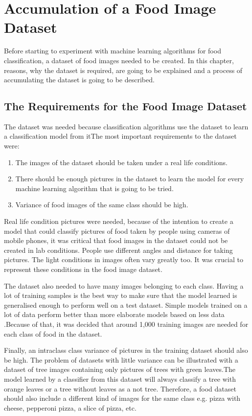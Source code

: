 \chapter{Accumulation of a Food Image Dataset}

Before starting to experiment with machine learning algorithms for food classification, a dataset of food images needed to be created. In this chapter, reasons, why the dataset is required, are going to be explained and a process of accumulating the dataset is going to be described.

\section{The Requirements for the Food Image Dataset}
 The dataset was needed because classification algorithms use the dataset to learn a classification model from itThe most important requirements to the dataset were:

\begin{enumerate}
  \item The images of the dataset should be taken under a real life conditions.
  \item There should be enough pictures in the dataset to learn the model for every machine learning algorithm that is going to be tried.
  \item Variance of food images of the same class should be high. 
\end{enumerate}

Real life condition pictures were needed, because of the intention to create a model that could classify pictures of food taken by people using cameras of mobile phones, it was critical that food images in the dataset could not be created in lab conditions. People use different angles and distance for taking pictures. The light conditions in images often vary greatly too. It was crucial to represent these conditions in the food image dataset.

The dataset also needed to have many images belonging to each class. Having a lot of training samples is the best way to make sure that the model learned is generalised enough to perform well on a test dataset. Simple models trained on a lot of data perform better than more elaborate models based on less data \citep{unreasonable}.Because of that, it was decided that around 1,000 training images are needed for each class of food in the dataset. 

Finally, an intraclass class variance of pictures in the training dataset should also be high. The problem of datasets with little variance can be illustrated with a dataset of tree images containing only pictures of trees with green leaves.The model learned by a classifier from this dataset will always classify a tree with orange leaves or a tree without leaves as a not tree. Therefore, a food dataset should also include a different kind of images for the same class e.g. pizza with cheese, pepperoni pizza, a slice of pizza, etc. 

